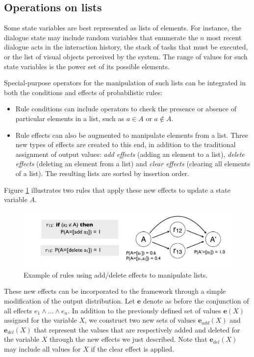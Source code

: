 \subsection{Operations on lists}

Some state variables are best represented as lists of elements. For instance, the dialogue state may include random variables that enumerate  the $n$ most recent dialogue acts in the interaction history, the stack of tasks that must be executed, or the list of visual objects perceived by the system.  The range of values for such state variables is the power set of its possible elements. 


Special-purpose operators for the manipulation of such lists can be integrated in both the conditions and effects of probabilistic rules: 
\begin{itemize}
\item Rule conditions can include operators to check the presence or absence of particular elements in a list, such as $a \in A$ or $a \notin A$. 
\item Rule effects can also be augmented to manipulate elements from a list.  Three new types of effects are created to this end, in addition to the traditional assignment of output values: \textit{add effects} (adding an element to a list), \textit{delete effects} (deleting an element from a list) and \textit{clear effects} (clearing all elements of a list). The resulting lists are sorted by insertion order. 
\end{itemize}

Figure \ref{fig:seteffects} illustrates two rules that apply these new effects to update a state variable $A$. 
 
\begin{figure}[h]
\centering
\includegraphics[scale=0.25]{imgs/seteffects.pdf}
\caption{Example of rules using add/delete effects to manipulate lists.}
\label{fig:seteffects}
\end{figure}

These new effects can be incorporated to the framework through a simple modification of the output distribution. Let $\mathbf{e}$ denote as before the conjunction of all effects $e_1 \land \dots \land e_n$. In addition to the previously defined set of values $\mathbf{e}(X)$ assigned for the variable $X$, we construct two new sets of values $\mathbf{e}_{add}(X)$ and $\mathbf{e}_{del}(X)$ that represent the values that are respectively added and deleted for the variable $X$ through the new effects we just described. Note that $\mathbf{e}_{del}(X)$ may include all values for $X$ if the clear effect is applied. 

